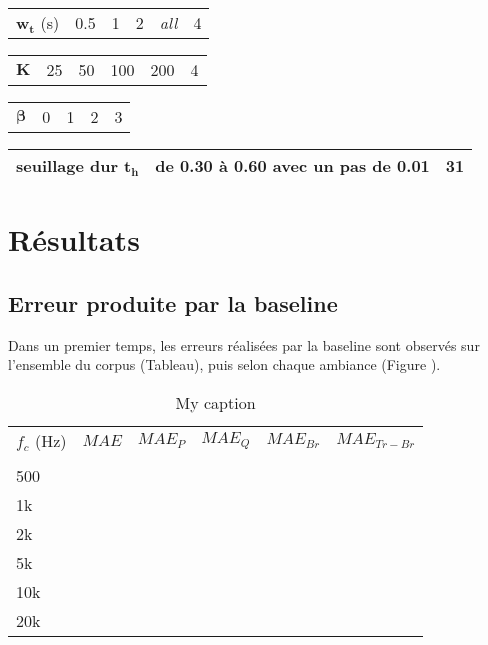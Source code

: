 \begin{table*}[t]
\begin{tabularx}{17.5cm}{L{3cm}@{}C{3cm}@{}@{}C{3cm}@{}@{}C{3cm}@{}@{}C{3cm}@{}C{2cm}@{}}
    $\mathbf{w_t}$ (s)& 0.5 & 1 & 2 & \textit{all} & 4\\
\end{tabularx}

\begin{tabularx}{17.5cm}{L{3cm}@{}C{3cm}@{}@{}C{3cm}@{}@{}C{3cm}@{}@{}C{3cm}@{}C{2cm}@{}}
    $\mathbf{K}$ & 25 & 50 & 100 & 200 & 4\\
\end{tabularx}


\begin{tabularx}{17.5cm}{L{3cm}@{}C{4cm}@{}@{}C{4cm}@{}@{}C{4cm}@{}C{2cm}@{}}
   $\mathbf{\beta}$ & 0 & 1 & 2 & 3\\
\end{tabularx}

\begin{tabularx}{17.5cm}{L{3cm}@{}C{12cm}@{}C{2cm}@{}}
   seuillage dur $\mathbf{t_h}$ & de 0.30 à 0.60 avec un pas de 0.01 & 31\\
   \bottomrule
\end{tabularx}
\label{tab:experimental_factorsNMF}
\end{table*}

\section{Résultats}

\subsection{Erreur produite par la baseline}
Dans un premier temps, les erreurs réalisées par la baseline sont observés sur l'ensemble du corpus (Tableau), puis selon chaque ambiance (Figure \Ref{}).

\begin{table}[]
\centering
\caption{My caption}
\label{my-label}
\begin{tabular}{llllll}
$f_c$ (Hz) & $MAE$ & $MAE_{P}$ & $MAE_Q$ & $MAE_{Br}$ & $MAE_{Tr-Br}$ \\
      &     &            &        &             &                \\
500   &     &            &        &             &                \\
1k    &     &            &        &             &                \\
2k    &     &            &        &             &                \\
5k    &     &            &        &             &                \\
10k   &     &            &        &             &                \\
20k   &     &            &        &             &               
\end{tabular}
\end{table}

